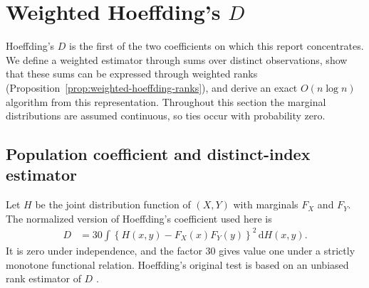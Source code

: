 \section{Weighted Hoeffding's \texorpdfstring{$D$}{D}}
\label{sec:weighted-hoeffding}

Hoeffding's $D$ is the first of the two coefficients on which this report
concentrates. We define a weighted estimator through sums over distinct
observations, show that these sums can be expressed through weighted ranks
(Proposition~\ref{prop:weighted-hoeffding-ranks}), and derive an exact
$O(n\log n)$ algorithm from this representation. Throughout this section the
marginal distributions are assumed continuous, so ties occur with probability
zero.

\subsection{Population coefficient and distinct-index estimator}

Let $H$ be the joint distribution function of $(X,Y)$ with marginals $F_X$
and $F_Y$. The normalized version of Hoeffding's coefficient used here is
\begin{align*}
    D
    &= 30\int
       \left\{H(x,y)-F_X(x)F_Y(y)\right\}^2\,\mathrm{d}H(x,y).
\end{align*}
It is zero under independence, and the factor $30$ gives value one under a
strictly monotone functional relation. Hoeffding's original test is based on
an unbiased rank estimator of $D$ \citep{hoeffding1948}.


